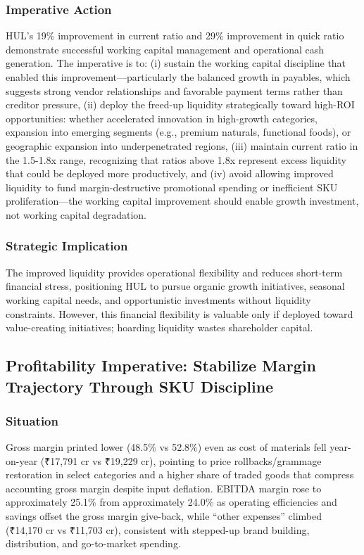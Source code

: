 \documentclass[12pt, a4paper]{report}
\begin{document}
\subsubsection{Imperative Action}
HUL's 19\% improvement in current ratio and 29\% improvement in quick ratio demonstrate successful working capital management and operational cash generation. The imperative is to: (i) sustain the working capital discipline that enabled this improvement—particularly the balanced growth in payables, which suggests strong vendor relationships and favorable payment terms rather than creditor pressure, (ii) deploy the freed-up liquidity strategically toward high-ROI opportunities: whether accelerated innovation in high-growth categories, expansion into emerging segments (e.g., premium naturals, functional foods), or geographic expansion into underpenetrated regions, (iii) maintain current ratio in the 1.5-1.8x range, recognizing that ratios above 1.8x represent excess liquidity that could be deployed more productively, and (iv) avoid allowing improved liquidity to fund margin-destructive promotional spending or inefficient SKU proliferation—the working capital improvement should enable growth investment, not working capital degradation.

\subsubsection{Strategic Implication}
The improved liquidity provides operational flexibility and reduces short-term financial stress, positioning HUL to pursue organic growth initiatives, seasonal working capital needs, and opportunistic investments without liquidity constraints. However, this financial flexibility is valuable only if deployed toward value-creating initiatives; hoarding liquidity wastes shareholder capital.

\subsection{Profitability Imperative: Stabilize Margin Trajectory Through SKU Discipline}

\subsubsection{Situation}
Gross margin printed lower (48.5\% vs 52.8\%) even as cost of materials fell year-on-year (₹17,791 cr vs ₹19,229 cr), pointing to price rollbacks/grammage restoration in select categories and a higher share of traded goods that compress accounting gross margin despite input deflation. EBITDA margin rose to approximately 25.1\% from approximately 24.0\% as operating efficiencies and savings offset the gross margin give-back, while ``other expenses'' climbed (₹14,170 cr vs ₹11,703 cr), consistent with stepped-up brand building, distribution, and go-to-market spending.
\end{document}
